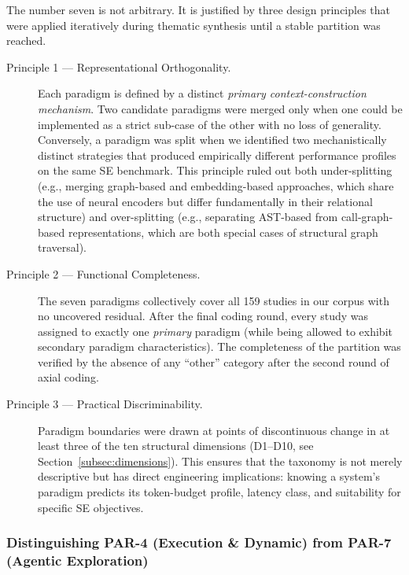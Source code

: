 \documentclass[acmsmall,screen,review]{acmart}
\begin{document}
The number seven is not arbitrary. It is justified by three
design principles that were applied iteratively during thematic
synthesis until a stable partition was reached.

\begin{description}
  \item[Principle 1 — Representational Orthogonality.] Each paradigm
    is defined by a distinct \emph{primary context-construction
    mechanism}. Two candidate paradigms were merged only when one could
    be implemented as a strict sub-case of the other with no loss of
    generality. Conversely, a paradigm was split when we identified two
    mechanistically distinct strategies that produced empirically
    different performance profiles on the same SE benchmark. This
    principle ruled out both under-splitting (e.g., merging graph-based
    and embedding-based approaches, which share the use of neural
    encoders but differ fundamentally in their relational structure) and
    over-splitting (e.g., separating AST-based from call-graph-based
    representations, which are both special cases of structural graph
    traversal).

  \item[Principle 2 — Functional Completeness.] The seven paradigms
    collectively cover all 159 studies in our corpus with no uncovered
    residual. After the final coding round, every study was assigned to
    exactly one \emph{primary} paradigm (while being allowed to exhibit
    secondary paradigm characteristics). The completeness of the
    partition was verified by the absence of any ``other'' category
    after the second round of axial coding.

  \item[Principle 3 — Practical Discriminability.] Paradigm boundaries
    were drawn at points of discontinuous change in at least three of
    the ten structural dimensions (D1–D10, see
    Section~\ref{subsec:dimensions}). This ensures that the taxonomy is
    not merely descriptive but has direct engineering implications:
    knowing a system's paradigm predicts its token-budget profile,
    latency class, and suitability for specific SE objectives.
\end{description}

\subsubsection{Distinguishing PAR-4 (Execution \& Dynamic) from
  PAR-7 (Agentic Exploration)}
\label{subsubsec:par4_vs_par7}
\end{document}
